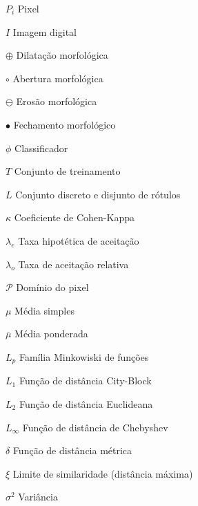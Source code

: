 \begin{simbolos}

\item[$P_i$]     Pixel
\item[$I$]       Imagem digital 
\item[$\oplus$]  Dilatação morfológica
\item[$\circ$]   Abertura morfológica
\item[$\ominus$] Erosão morfológica
\item[$\bullet$] Fechamento morfológico
\item[$\phi$]    Classificador
\item[$T$]       Conjunto de treinamento
\item[$L$]       Conjunto discreto e disjunto de rótulos
\item[$\kappa$]  Coeficiente de Cohen-Kappa
\item[$\lambda_e$]  Taxa hipotética de aceitação
\item[$\lambda_o$]  Taxa de aceitação relativa
\item[$\mathcal{P}$] Domínio do pixel



\item[$\mu$]      Média simples
\item[$\bar{\mu}$]  Média ponderada
\item[{$L_p$}]   Família Minkowiski de funções
\item[{$L_1$}]   Função de distância City-Block
\item[{$L_2$}]   Função de distância Euclideana
\item[{$L_\infty$}] Função de distância de Chebyshev

\item[$\delta$] Função de distância métrica
\item[$\xi$] Limite de similaridade (distância máxima)
\item[$\sigma^2$] Variância



\end{simbolos}
